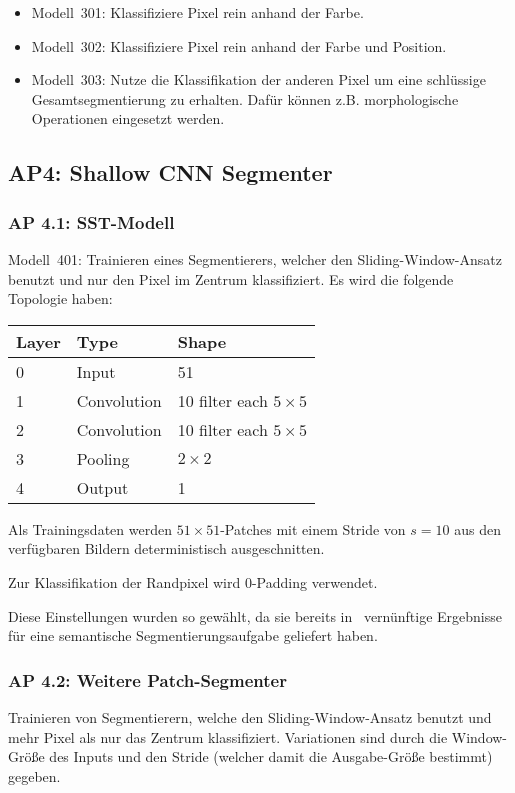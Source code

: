 \begin{itemize}
    \item Modell~301: Klassifiziere Pixel rein anhand der Farbe.
    \item Modell~302: Klassifiziere Pixel rein anhand der Farbe und Position.
    \item Modell~303: Nutze die Klassifikation der anderen Pixel um eine
          schlüssige Gesamtsegmentierung zu erhalten. Dafür können z.B.
          morphologische Operationen eingesetzt werden.
\end{itemize}

\clearpage
\subsection{AP4: Shallow CNN Segmenter}
\subsubsection{AP 4.1: SST-Modell}
Modell~401: Trainieren eines Segmentierers, welcher den Sliding-Window-Ansatz
benutzt und nur den Pixel im Zentrum klassifiziert. Es wird die folgende
Topologie haben:

\begin{table}[h!]
    \centering
    \begin{tabular}{lll}
    \toprule
    \textbf{Layer} & \textbf{Type} & \textbf{Shape} \\\midrule
    0     & Input       & 51\\
    1     & Convolution & 10 filter each $5\times 5$ \\
    2     & Convolution & 10 filter each $5\times 5$ \\
    3     & Pooling     & $2\times 2$ \\
    4     & Output      & 1 \\ \bottomrule
    \end{tabular}
\end{table}

Als Trainingsdaten werden $51 \times 51$-Patches mit einem Stride von $s=10$
aus den verfügbaren Bildern deterministisch ausgeschnitten.

Zur Klassifikation der Randpixel wird 0-Padding verwendet.

Diese Einstellungen wurden so gewählt, da sie bereits in~\cite{bittel2015pixel}
vernünftige Ergebnisse für eine semantische Segmentierungsaufgabe geliefert
haben.

\subsubsection{AP 4.2: Weitere Patch-Segmenter}
Trainieren von Segmentierern, welche den Sliding-Window-Ansatz benutzt und
mehr Pixel als nur das Zentrum klassifiziert. Variationen sind durch die
Window-Größe des Inputs und den Stride
(welcher damit die Ausgabe-Größe bestimmt) gegeben.

